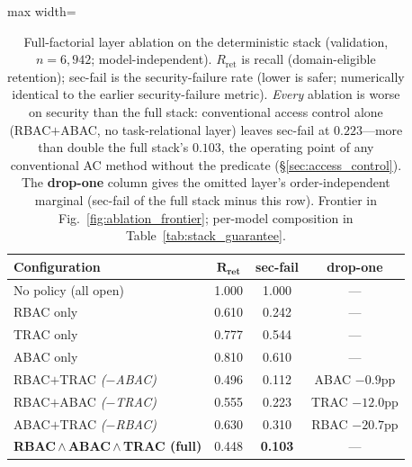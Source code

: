 \documentclass[sigconf,review,anonymous]{acmart}
\begin{document}
\begin{table}[!t]
\centering
\caption{Full-factorial layer ablation on the deterministic stack (validation, $n=6{,}942$; model-independent). $R_{\text{ret}}$ is recall (domain-eligible retention); sec-fail is the security-failure rate (lower is safer; numerically identical to the earlier security-failure metric). \emph{Every} ablation is worse on security than the full stack: conventional access control alone (RBAC$+$ABAC, no task-relational layer) leaves sec-fail at $0.223$---more than double the full stack's $0.103$, the operating point of any conventional AC method without the predicate (\S\ref{sec:access_control}). The \textbf{drop-one} column gives the omitted layer's order-independent marginal (sec-fail of the full stack minus this row). Frontier in Fig.~\ref{fig:ablation_frontier}; per-model composition in Table~\ref{tab:stack_guarantee}.}
\label{tab:factorial_ablation}
\footnotesize
\setlength{\tabcolsep}{6pt}
\begin{adjustbox}{max width=\columnwidth}
\begin{tabular}{@{}lccc@{}}
\toprule
\textbf{Configuration} & $\mathbf{R_{\text{ret}}}$ & \textbf{sec-fail} & \textbf{drop-one} \\
\midrule
No policy (all open)             & 1.000 & 1.000 & --- \\
\addlinespace[2pt]
RBAC only                        & 0.610 & 0.242 & --- \\
TRAC only                        & 0.777 & 0.544 & --- \\
ABAC only                        & 0.810 & 0.610 & --- \\
\addlinespace[2pt]
RBAC$+$TRAC \textit{($-$ABAC)}   & 0.496 & 0.112 & ABAC $-0.9$pp \\
RBAC$+$ABAC \textit{($-$TRAC)}   & 0.555 & 0.223 & TRAC $-12.0$pp \\
ABAC$+$TRAC \textit{($-$RBAC)}   & 0.630 & 0.310 & RBAC $-20.7$pp \\
\midrule
\textbf{RBAC\,$\wedge$\,ABAC\,$\wedge$\,TRAC (full)} & 0.448 & \textbf{0.103} & --- \\
\bottomrule
\end{tabular}
\end{adjustbox}
\end{table}
\end{document}

